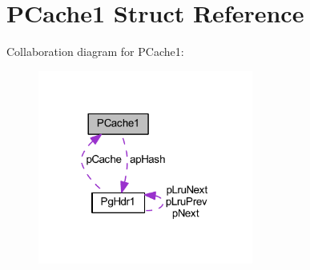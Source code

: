 \hypertarget{struct_p_cache1}{\section{P\-Cache1 Struct Reference}
\label{struct_p_cache1}
}


Collaboration diagram for P\-Cache1\-:\nopagebreak
\begin{figure}[H]
\begin{center}
\leavevmode
\includegraphics[width=200pt]{struct_p_cache1__coll__graph}
\end{center}
\end{figure}
